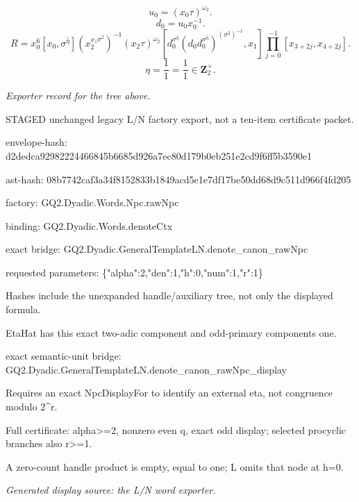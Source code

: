 \[u_0=(x_0\tau)^{\omega_2}.\]
\[d_0=u_0x_0^{-1}.\]
\[R=x_0^6[x_0,\sigma^{\widehat{\eta}}](x_2^{x_1\sigma^2})^{-1}(x_2\tau)^{\omega_2}[d_0^{\sigma^{\widehat{\eta}}}(d_0d_0^{\sigma^{\widehat{\eta}}})^{(\sigma^2)^{-1}},x_1]\prod_{j=0}^{-1}[x_{3+2j},x_{4+2j}].\]
\[\eta=\frac{1}{1}=\frac{1}{1}\in\mathbf Z_2^\times.\]
\par\noindent\emph{Exporter record for the tree above.}
\par\noindent STAGED unchanged legacy L/N factory export, not a ten-item certificate packet.
\par\noindent envelope-hash: d2dedca92982224466845b6685d926a7ec80d179b0eb251e2cd9f6ff5b3590e1
\par\noindent ast-hash: 08b7742caf3a34f8152833b1849acd5e1e7df17be50dd68d9c511d966f4fd205
\par\noindent factory: GQ2.Dyadic.Words.Npc.rawNpc
\par\noindent binding: GQ2.Dyadic.Words.denoteCtx
\par\noindent exact bridge: GQ2.Dyadic.GeneralTemplateLN.denote\_canon\_rawNpc
\par\noindent requested parameters: \{"alpha":2,"den":1,"h":0,"num":1,"r":1\}
\par\noindent Hashes include the unexpanded handle/auxiliary tree, not only the displayed formula.
\par\noindent EtaHat has this exact two-adic component and odd-primary components one.
\par\noindent exact semantic-unit bridge: GQ2.Dyadic.GeneralTemplateLN.denote\_canon\_rawNpc\_display
\par\noindent Requires an exact NpcDisplayFor to identify an external eta, not congruence modulo 2\textasciicircum{}r.
\par\noindent Full certificate: alpha>=2, nonzero even q, exact odd display; selected procyclic branches also r>=1.
\par\noindent A zero-count handle product is empty, equal to one; L omits that node at h=0.
\par\noindent\emph{Generated display source: the L/N word exporter.}
